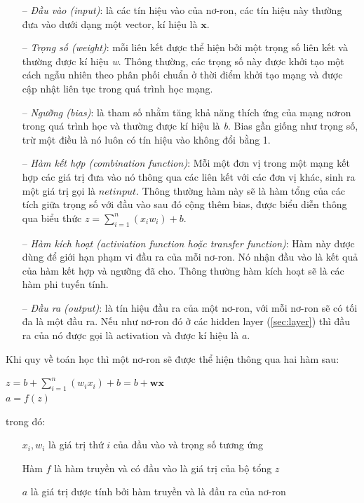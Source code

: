 \begin{itemize}
	\item[--]\textit{Đầu vào (input)}: là các tín hiệu vào của nơ-ron, các tín hiệu này thường đưa vào dưới dạng một vector, kí hiệu là $\textbf{x}$.
	\item[--] \textit{Trọng số (weight)}: mỗi liên kết được thể hiện bởi một trọng số liên kết và thường được kí hiệu \textit{w}. Thông thường, các trọng số này được khởi tạo một cách ngẫu nhiên theo phân phối chuẩn ở thời điểm khởi tạo mạng và được cập nhật liên tục trong quá trình học mạng.

	\item[--] \textit{Ngưỡng (bias)}: là tham số nhằm tăng khả năng thích ứng của mạng nơron trong quá trình học và thường được kí hiệu là \textit{b}. Bias gần giống như trọng số, trừ một điều là nó luôn có tín hiệu vào không đổi bằng 1.
	
	\item[--] \textit{Hàm kết hợp (combination function)}: Mỗi một đơn vị trong một mạng kết hợp các giá trị đưa vào nó thông qua các liên kết với các đơn vị khác, sinh ra một giá trị gọi là $net input$. Thông thường hàm này sẽ là hàm tổng của các tích giữa trọng số với đầu vào sau đó cộng thêm bias, được biểu diễn thông qua biểu thức $z = \sum_{i=1}^n(x_iw_i) +b$.
	\item[--] \textit{Hàm kích hoạt (activiation function hoặc transfer function)}: Hàm này được dùng để giới hạn phạm vi đầu ra của mỗi nơ-ron. Nó nhận đầu vào là kết quả của hàm kết hợp và ngưỡng đã cho. Thông thường hàm kích hoạt sẽ là các hàm phi tuyến tính.
	\item[--] \textit{Đầu ra (output)}: là tín hiệu đầu ra của một nơ-ron, với mỗi nơ-ron sẽ có tối đa là một đầu ra. Nếu như nơ-ron đó ở các hidden layer (\ref{sec:layer}) thì đầu ra của nó được gọi là activation và được kí hiệu là $a$.
\end{itemize}
\par
Khi quy về toán học thì một nơ-ron sẽ được thể hiện thông qua hai hàm sau:
\begin{center}
$z = b + \sum_{i=1}^n(w_{i}x_{i})+b = b + \textbf{w}\textbf{x}$\\[5pt]
$a = f(z)$
\end{center}
  trong đó:
\begin{itemize}
\setlength{\itemindent}{5mm}
	\item[\textendash] $x_i,w_i$ là giá trị thứ $i$ của đầu vào và trọng số tương ứng
	\item[\textendash] Hàm $f$ là hàm truyền và có đầu vào là giá trị của bộ tổng $z$
	\item[\textendash] $a$ là giá trị được tính bởi hàm truyền và là đầu ra của nơ-ron
\end{itemize}
